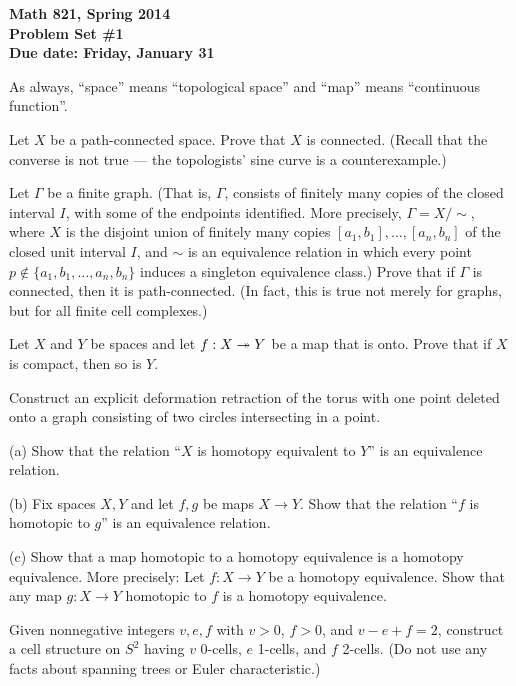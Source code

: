 

\thispagestyle{empty}
{\bf Math 821, Spring 2014\\
Problem Set \#1\\
Due date: Friday, January 31}

As always, ``space'' means ``topological space'' and ``map'' means ``continuous function''.

\prob
Let $X$ be a path-connected space.
Prove that $X$ is connected.  (Recall that the
converse is not true --- the topologists' sine curve
is a counterexample.)

\prob Let $\Gamma$ be a finite graph.  (That is,
$\Gamma$, consists of finitely many copies of the closed interval
$I$, with some of the endpoints identified.
More precisely, $\Gamma=X/\sim$, where $X$ is the disjoint union of
finitely many copies $[a_1,b_1],\dots,[a_n,b_n]$ of
the closed unit interval $I$, and $\sim$ is an equivalence
relation in which every point $p\not\in\{a_1,b_1,\dots,a_n,b_n\}$
induces a singleton equivalence class.)  Prove that if $\Gamma$
is connected, then it is path-connected.  (In fact, this is true not merely
for graphs, but for all finite cell complexes.)

\prob Let $X$ and $Y$ be spaces and
let $f:X\twoheadrightarrow Y$ be a map that is onto.
Prove that if $X$ is compact, then so is $Y$.

\prob [Hatcher p.18 \#1] Construct an explicit deformation retraction of the torus with one point deleted onto a graph consisting of two circles intersecting in a point.

  (a) Show that the relation ``$X$ is homotopy equivalent to $Y$''
is an equivalence relation.

(b) Fix spaces $X,Y$ and let $f,g$ be maps $X\to Y$.  Show that the relation ``$f$ is homotopic to $g$'' is an equivalence relation.

(c) Show that a map homotopic to a homotopy equivalence is a homotopy equivalence.
More precisely:
Let $f:X\to Y$ be a homotopy equivalence.  Show that any map $g:X\to Y$ homotopic to $f$ is a homotopy equivalence.

\prob [Hatcher p.19 \#14] Given nonnegative integers $v,e,f$ with $v>0$, $f>0$, and $v-e+f=2$, construct a cell structure on $S^2$ having $v$ 0-cells, $e$ 1-cells, 
and $f$ 2-cells.  (Do not use any facts about spanning trees or Euler characteristic.)


